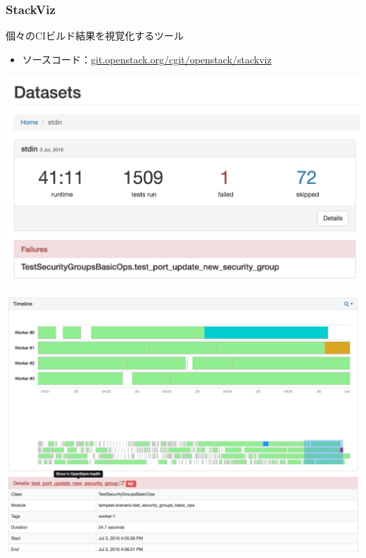 \documentclass[aspectratio=169,11pt,hyperref={colorlinks=true}]{beamer}
\begin{document}
\begin{frame}
  \frametitle{StackViz}
  個々のCIビルド結果を視覚化するツール
  \begin{itemize}
    \item ソースコード：\href{http://git.openstack.org/cgit/openstack/stackviz}{git.openstack.org/cgit/openstack/stackviz}
  \end{itemize}
  \begin{center}
    \includegraphics[width=1.3\textheight]{stackviz-sample-top.png}
  \end{center}
\end{frame}

\begin{frame}
  \begin{center}
    \includegraphics[width=1.3\textheight]{stackviz-sample-timeline.png}
  \end{center}
\end{frame}
\end{document}
